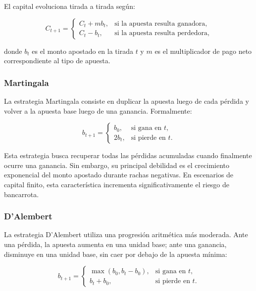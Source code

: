 \documentclass{article}
\begin{document}
El capital evoluciona tirada a tirada según:

\begin{equation}
    C_{t+1} =
    \begin{cases}
    C_t + m b_t, & \text{si la apuesta resulta ganadora},\\
    C_t - b_t, & \text{si la apuesta resulta perdedora},
    \end{cases}
\end{equation}

donde $b_t$ es el monto apostado en la tirada $t$ y $m$ es el multiplicador de pago neto correspondiente al tipo de apuesta.

\subsubsection{Martingala}

La estrategia Martingala consiste en duplicar la apuesta luego de cada pérdida y volver a la apuesta base luego de una ganancia. Formalmente:

\begin{equation}
    b_{t+1} =
    \begin{cases}
    b_0, & \text{si gana en } t,\\
    2b_t, & \text{si pierde en } t.
    \end{cases}
\end{equation}

Esta estrategia busca recuperar todas las pérdidas acumuladas cuando finalmente ocurre una ganancia. Sin embargo, su principal debilidad es el crecimiento exponencial del monto apostado durante rachas negativas. En escenarios de capital finito, esta característica incrementa significativamente el riesgo de bancarrota.

\subsubsection{D'Alembert}

La estrategia D'Alembert utiliza una progresión aritmética más moderada. Ante una pérdida, la apuesta aumenta en una unidad base; ante una ganancia, disminuye en una unidad base, sin caer por debajo de la apuesta mínima:

\begin{equation}
    b_{t+1} =
    \begin{cases}
    \max(b_0, b_t-b_0), & \text{si gana en } t,\\
    b_t+b_0, & \text{si pierde en } t.
    \end{cases}
\end{equation}
\end{document}
